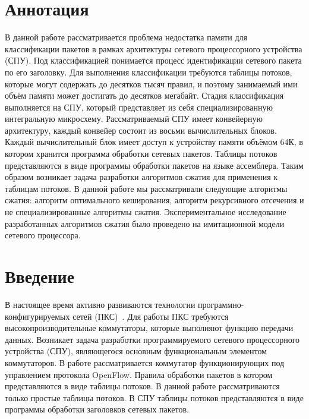 \documentclass[oneside,final,12pt]{extarticle}
\begin{document}

    \section*{Аннотация}
        В данной работе рассматривается проблема недостатка памяти для классификации пакетов в рамках архитектуры сетевого процессорного устройства (СПУ). 
        Под классификацией понимается процесс идентификации сетевого пакета по его заголовку.
        Для выполнения классификации требуются таблицы потоков, которые могут содержать до десятков тысяч правил, и поэтому занимаемый ими объём памяти может достигать до десятков мегабайт. 
        Стадия классификация выполняется на СПУ, который представляет из себя специализированную интегральную микросхему. Рассматриваемый СПУ имеет
        конвейерную архитектуру, каждый конвейер состоит из восьми вычислительных блоков. Каждый вычислительный блок имеет доступ к устройству памяти объёмом 64К, 
        в котором хранится программа обработки сетевых пакетов. Таблицы потоков представляются в виде программы обработки пакетов на языке ассемблера. 
        Таким образом возникает задача разработки алгоритмов сжатия для применения к таблицам потоков.  В данной работе мы рассматривали следующие алгоритмы сжатия: 
        алгоритм оптимального кеширования, алгоритм рекурсивного отсечения и не специализированные алгоритмы сжатия. 
        Экспериментальное исследование разработанных алгоритмов сжатия было проведено на имитационной модели сетевого процессора.
    \newpage
    \tableofcontents
    \newpage

    \section*{Введение}
        В настоящее время активно развиваются технологии программно-конфигурируемых сетей (ПКС)~\cite{smel_sdn}. Для работы ПКС требуются высокопроизводительные коммутаторы, 
        которые выполняют функцию передачи данных. Возникает задача разработки программируемого сетевого процессорного устройства (СПУ),
        являющегося основным функциональным элементом коммутаторов. В работе рассматривается коммутатор функционирующих под управлением протокола OpenFlow.
        Правила обработки пакетов в котором представляются в виде таблицы потоков. В данной работе рассматриваются только простые таблицы потоков.
        В СПУ таблицы потоков представляются в виде программы обработки заголовков сетевых пакетов.
\end{document}
